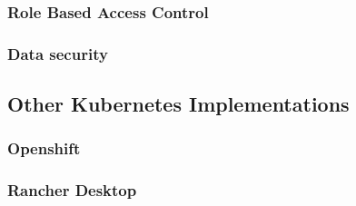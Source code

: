 \subsubsection*{Role Based Access Control}

\subsubsection*{Data security}

\subsection{Other Kubernetes Implementations}
\label{sec:other-kubernetes-implementations}

\subsubsection*{Openshift}

\subsubsection*{Rancher Desktop}